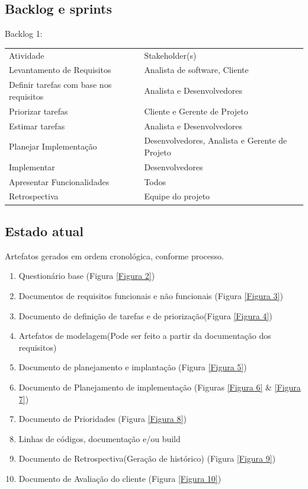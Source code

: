 \documentclass[	DIV=calc,%
							paper=a4,%
							fontsize=12pt,%
							onecolumn]{scrartcl}	 					%
\begin{document}
\subsection{Backlog e sprints}
Backlog 1:
\begin{table}[H]
	\begin{tabular}{|l|l|
		}
		Atividade                               & Stakeholder(s)                                 \\
		Levantamento de Requisitos              & Analista de software, Cliente                  \\
		Definir tarefas com base nos requisitos & Analista e Desenvolvedores                     \\
		Priorizar tarefas                       & Cliente e Gerente de Projeto                   \\
		Estimar tarefas                         & Analista e Desenvolvedores                     \\
		Planejar Implementação                  & Desenvolvedores, Analista e Gerente de Projeto \\
		Implementar                             & Desenvolvedores                                \\
		Apresentar Funcionalidades              & Todos                                          \\
		Retrospectiva                           & Equipe do projeto                             
	\end{tabular}
\end{table}


\subsection{Estado atual}
Artefatos gerados em ordem cronológica, conforme processo. 
\begin{enumerate}
	\item Questionário base (Figura \ref{Figura 2})
	\item Documentos de requisitos funcionais e não funcionais (Figura \ref{Figura 3})
	\item Documento de definição de tarefas e de priorização(Figura \ref{Figura 4})
	\item Artefatos de modelagem(Pode ser feito a partir da documentação dos requisitos)
	\item Documento de planejamento e implantação (Figura \ref{Figura 5})
	\item Documento de Planejamento de implementação (Figuras \ref{Figura 6} \& \ref{Figura 7})
	\item Documento de Prioridades  (Figura \ref{Figura 8})
	\item Linhas de códigos, documentação e/ou build
	\item Documento de Retrospectiva(Geração de histórico)  (Figura \ref{Figura 9})
	\item Documento de Avaliação do cliente  (Figura \ref{Figura 10})
\end{enumerate}
\end{document}
